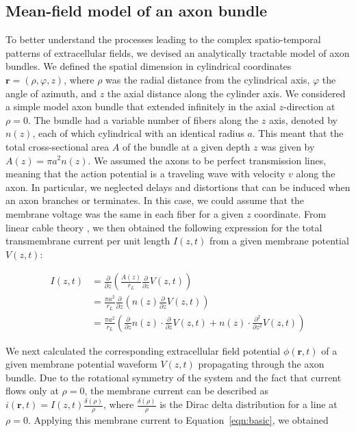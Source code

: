 \documentclass[]{elife}
\begin{document}
\subsection{Mean-field model of an axon
bundle}\label{mean-field-model-of-an-axon-bundle}

\label{sec:efpresp}

To better understand the processes leading to the complex
spatio-temporal patterns of extracellular fields, we devised an
analytically tractable model of axon bundles. We defined the spatial
dimension in cylindrical coordinates \(\mathbf{r}=(\rho,\varphi,z)\),
where \(\rho\) was the radial distance from the cylindrical axis,
\(\varphi\) the angle of azimuth, and \(z\) the axial distance along the
cylinder axis. We considered a simple model axon bundle that extended
infinitely in the axial \(z\)-direction at \(\rho=0\). The bundle had a
variable number of fibers along the \(z\) axis, denoted by \(n(z)\),
each of which cylindrical with an identical radius \(a\). This meant
that the total cross-sectional area \(A\) of the bundle at a given depth
\(z\) was given by \(A(z)=\pi a^2 n(z)\). We assumed the axons to be
perfect transmission lines, meaning that the action potential is a
traveling wave with velocity \(v\) along the axon. In particular, we
neglected delays and distortions that can be induced when an axon
branches or terminates. In this case, we could assume that the membrane
voltage was the same in each fiber for a given \(z\) coordinate. From
linear cable theory \citep[e.g.][]{Jack75Electric}, we then obtained the
following expression for the total transmembrane current per unit length
\(I(z,t)\) from a given membrane potential \(V(z,t)\):

\begin{align}
I(z,t)& = \frac{\partial }{\partial z}\left(\frac{A(z)}{r_L}\frac{\partial }{\partial z}V(z,t)\right)\\
&= \frac{\pi a^2}{r_L}\frac{\partial }{\partial z}\left(n(z)\frac{\partial }{\partial z}V(z,t)\right) \\
&= \frac{\pi a^2}{r_L}\left(\frac{\partial}{\partial z}n(z)\cdot\frac{\partial}{\partial z}V(z,t)+n(z)\cdot\frac{\partial ^2}{\partial z^2}V(z,t)\right)
\label{eqn:current}
\end{align}

We next calculated the corresponding extracellular field potential
\(\phi(\mathbf{r},t)\) of a given membrane potential waveform \(V(z,t)\)
propagating through the axon bundle. Due to the rotational symmetry of
the system and the fact that current flows only at \(\rho = 0\), the
membrane current can be described as
\(i(\mathbf{r},t)=I(z,t)\frac{\delta(\rho)}{\rho}\), where
\(\frac{\delta(\rho)}{\rho}\) is the Dirac delta distribution for a line
at \(\rho=0\). Applying this membrane current to Equation~\ref{eqn:basic}, we obtained
\end{document}
